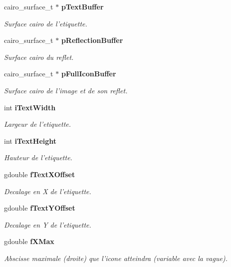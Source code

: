 \begin{CompactItemize}
cairo\_\-surface\_\-t $\ast$ {\bf pTextBuffer}
\begin{CompactList}\small\item\em Surface cairo de l'etiquette. \item\end{CompactList}\item 
cairo\_\-surface\_\-t $\ast$ {\bf pReflectionBuffer}
\begin{CompactList}\small\item\em Surface cairo du reflet. \item\end{CompactList}\item 
cairo\_\-surface\_\-t $\ast$ {\bf pFullIconBuffer}
\begin{CompactList}\small\item\em Surface cairo de l'image et de son reflet. \item\end{CompactList}\item 
int {\bf iTextWidth}
\begin{CompactList}\small\item\em Largeur de l'etiquette. \item\end{CompactList}\item 
int {\bf iTextHeight}
\begin{CompactList}\small\item\em Hauteur de l'etiquette. \item\end{CompactList}\item 
gdouble {\bf fTextXOffset}
\begin{CompactList}\small\item\em Decalage en X de l'etiquette. \item\end{CompactList}\item 
gdouble {\bf fTextYOffset}
\begin{CompactList}\small\item\em Decalage en Y de l'etiquette. \item\end{CompactList}\item 
gdouble {\bf fXMax}
\begin{CompactList}\small\item\em Abscisse maximale (droite) que l'icone atteindra (variable avec la vague). \item\end{CompactList}\item 

\end{CompactItemize}
